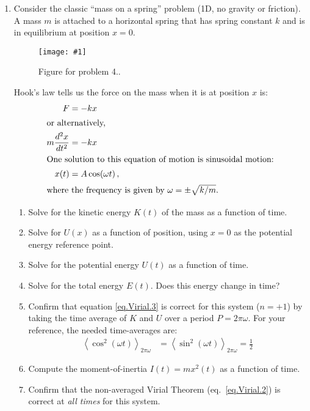 \documentclass[11pt]{article}
\newcommand\plotoneman[2]{\centering \leavevmode
  \texttt{[image: \#1]}}
\begin{document}
\begin{enumerate}[resume]
\item 
  Consider the classic ``mass on a spring'' problem (1D, no gravity or
  friction). A mass $m$ is attached to a horizontal spring that has
  spring constant $k$ and is in equilibrium at position $x=0$.

  \begin{figure*}[hbt]
    \plotoneman{spring}{0.3}
    \caption{Figure for problem 4..}
  \end{figure*}

  Hook's law tells us the force on the mass when it is at position
  $x$ is:
  \begin{align}
    F&= -kx\, \label{eq.Hook1}\\
    \intertext{or alternatively,}
    m \frac{d^2 x}{dt^2} &= - kx \label{eq.Hook2}\\
    \intertext{One solution to this equation of motion is sinusoidal
      motion:}
    x(t) &= A \cos(\omega t)\,, \label{eq.Hook3}\\
    \intertext{where the frequency is given by $\omega = \pm \sqrt{k /
      m}$.}
  \end{align}

  \begin{enumerate}
  \item
    Solve for the kinetic energy $K(t)$ of the mass as a function of time.
  \item
    Solve for $U(x)$ as a function of position, using $x=0$ as the
    potential energy reference point.
  \item
    Solve for the potential energy $U(t)$ as a function of time.
  \item
    Solve for the total energy $E(t)$. Does this energy change in
    time?
  \item
    Confirm that equation \ref{eq.Virial.3} is correct for this system
    ($n=+1$) by taking the time average of $K$ and $U$ over a period
    $P = 2\pi\omega$. For your reference, the needed time-averages are:
    \begin{align}
      \left<\cos^2(\omega t)\right>_{2\pi\omega} &=
      \left<\sin^2(\omega t)\right>_{2\pi\omega} = \frac{1}{2} \label{eq.Hook4}
    \end{align}
  \item
    Compute the moment-of-inertia $I(t) = m x^2(t)$ as a function of
    time.
  \item
    Confirm that the non-averaged Virial Theorem (eq.~\ref{eq.Virial.2})
    is correct at \textit{all times} for this system.
  \end{enumerate}


\end{enumerate}
\end{document}
